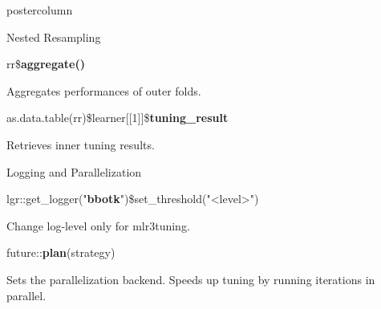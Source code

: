\documentclass{beamer}
\begin{document}
\begin{frame}[fragile]{}
\begin{columns}
\begin{column}{.245\textwidth}
\begin{beamercolorbox}[center]{postercolumn}
\begin{minipage}{.98\textwidth}
{\begin{myblock}{Nested Resampling}
\begin{codebox}
								rr\$\textbf{aggregate()}
							\end{codebox}
							Aggregates performances of outer folds.
							\\
							\begin{codebox}
								\footnotesize{as.data.table(rr)\$learner[[1]]\$\textbf{tuning\_result}}
							\end{codebox}
							Retrieves inner tuning results.
							\vspace{-0.5em}
						\end{myblock}
						\begin{myblock}{Logging and Parallelization}
							\begin{codebox}
								{\scriptsize
									lgr::get\_logger("\textbf{bbotk}")\$set\_threshold("<level>")}
							\end{codebox}
							Change log-level only for mlr3tuning.\\
							\begin{codebox}
								future::\textbf{plan}(strategy)
							\end{codebox}
							Sets the parallelization backend.
							Speeds up tuning by running iterations in parallel.
						\end{myblock}
						\vfill}
				\end{minipage}
			\end{beamercolorbox}
		\end{column}
	\end{columns}
\end{frame}
\end{document}
